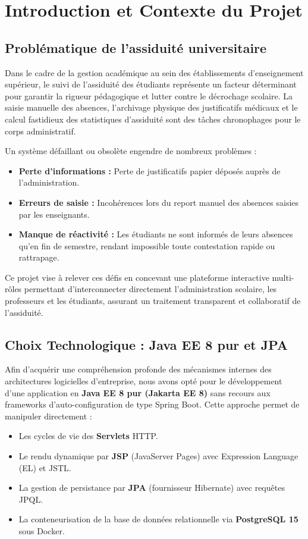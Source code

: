 \documentclass[12pt,a4paper]{article}
\begin{document}
\newpage
\tableofcontents
\newpage

\section{Introduction et Contexte du Projet}

\subsection{Problématique de l'assiduité universitaire}
Dans le cadre de la gestion académique au sein des établissements d'enseignement supérieur, le suivi de l'assiduité des étudiants représente un facteur déterminant pour garantir la rigueur pédagogique et lutter contre le décrochage scolaire. La saisie manuelle des absences, l'archivage physique des justificatifs médicaux et le calcul fastidieux des statistiques d'assiduité sont des tâches chronophages pour le corps administratif.

Un système défaillant ou obsolète engendre de nombreux problèmes :
\begin{itemize}
    \item \textbf{Perte d'informations :} Perte de justificatifs papier déposés auprès de l'administration.
    \item \textbf{Erreurs de saisie :} Incohérences lors du report manuel des absences saisies par les enseignants.
    \item \textbf{Manque de réactivité :} Les étudiants ne sont informés de leurs absences qu'en fin de semestre, rendant impossible toute contestation rapide ou rattrapage.
\end{itemize}

Ce projet vise à relever ces défis en concevant une plateforme interactive multi-rôles permettant d'interconnecter directement l'administration scolaire, les professeurs et les étudiants, assurant un traitement transparent et collaboratif de l'assiduité.

\subsection{Choix Technologique : Java EE 8 pur et JPA}
Afin d'acquérir une compréhension profonde des mécanismes internes des architectures logicielles d'entreprise, nous avons opté pour le développement d'une application en \textbf{Java EE 8 pur (Jakarta EE 8)} sans recours aux frameworks d'auto-configuration de type Spring Boot. Cette approche permet de manipuler directement :
\begin{itemize}
    \item Les cycles de vie des \textbf{Servlets} HTTP.
    \item Le rendu dynamique par \textbf{JSP} (JavaServer Pages) avec Expression Language (EL) et JSTL.
    \item La gestion de persistance par \textbf{JPA} (fournisseur Hibernate) avec requêtes JPQL.
    \item La conteneurisation de la base de données relationnelle via \textbf{PostgreSQL 15} sous Docker.
\end{itemize}
\end{document}
